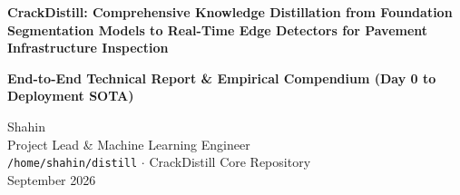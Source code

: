 \documentclass[11pt,a4paper]{article}
\newcommand{\yolo}{YOLOv11n-seg}
\newcommand{\sam}{SAM~2 Large}
\begin{document}

\begin{titlepage}
\centering\vspace*{1.2cm}

{\LARGE\bfseries\color{navyblue} CrackDistill: Comprehensive Knowledge Distillation from Foundation Segmentation Models to Real-Time Edge Detectors for Pavement Infrastructure Inspection\par}

\vspace{0.8cm}
{\large\bfseries End-to-End Technical Report \& Empirical Compendium (Day 0 to Deployment SOTA)\par}

\vspace{1.2cm}
{\Large Shahin}\\[0.4em]
{\normalsize Project Lead \& Machine Learning Engineer}\\[0.3em]
{\small \texttt{/home/shahin/distill} $\cdot$ CrackDistill Core Repository}\\[0.5em]
{\normalsize September 2026}

\vspace{1.2cm}
\begin{tcolorbox}[colback=boxbg,colframe=boxframe,arc=3mm,width=0.95\textwidth]
\begin{abstract}\small{}
Automated highway pavement defect inspection requires resolving a severe trade-off: capturing \emph{sub-pixel, complex fracture topology} across wide-field pavement surfaces while simultaneously maintaining \emph{ultra-low inference latency ($>100$\,FPS)} on edge hardware. 
We present \textbf{CrackDistill}, an end-to-end framework that transfers the structural and spatial priors of a 224M-parameter foundation vision model (\textbf{\sam}) into an ultra-compact single-stage detector (\textbf{\yolo, 2.84M parameters, 6.2\,MB}) with \textbf{zero runtime teacher overhead}. 


\end{abstract}
\end{tcolorbox}
\end{titlepage}
\end{document}
